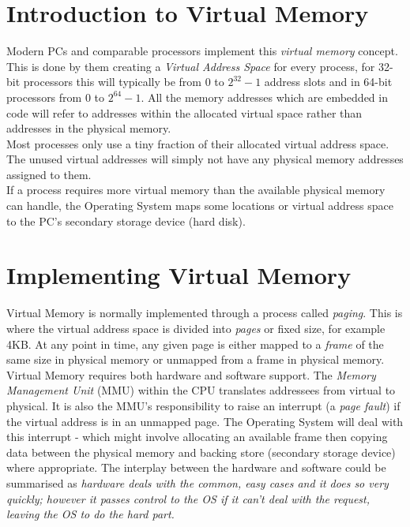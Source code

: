 \section{Introduction to Virtual Memory}
Modern PCs and comparable processors implement this \textit{virtual memory} concept. This is done by them creating a \textit{Virtual Address Space} for every process, for 32-bit processors this will typically be from 0 to $2^{32}-1$ address slots and in 64-bit processors from 0 to $2^{64}-1$. All the memory addresses which are embedded in code will refer to addresses within the allocated virtual space rather than addresses in the physical memory.\\

Most processes only use a tiny fraction of their allocated virtual address space. The unused virtual addresses will simply not have any physical  memory addresses assigned to them.\\

If a process requires more virtual memory than the available physical memory can handle, the Operating System maps some locations or virtual address space to the PC's secondary storage device (hard disk). 

\section{Implementing Virtual Memory}
Virtual Memory is normally implemented through a process called \textit{paging}. This is where the virtual address space is divided into \textit{pages} or fixed size, for example 4KB. At any point in time, any given page is either mapped to a \textit{frame} of the same size in physical memory or unmapped from a frame in physical memory.\\

Virtual Memory requires both hardware and software support. The \textit{Memory Management Unit} (MMU) within the CPU translates addressees from virtual to physical. It is also the MMU's responsibility to raise an interrupt (a \textit{page fault}) if the virtual address is in an unmapped page. The Operating System will deal with this interrupt - which might involve allocating an available frame then copying data between the physical memory and backing store (secondary storage device) where appropriate. The interplay between the hardware and software could be summarised as \textit{hardware deals with the common, easy cases and it does so very quickly; however it passes control to the OS if it can't deal with the request, leaving the OS to do the hard part.}

